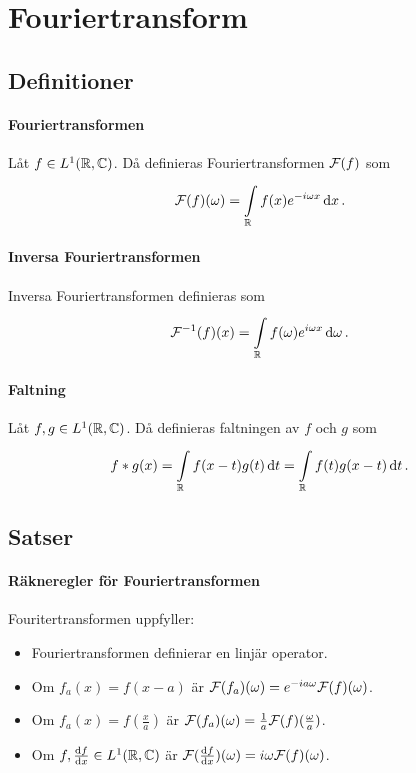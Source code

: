\section{Fouriertransform}

\subsection{Definitioner}

\paragraph{Fouriertransformen}
Låt $f\in L^{1}(\mathbb{R}, \mathbb{C})$. Då definieras Fouriertransformen $\mathcal{F}(f)$ som
\begin{align*}
	\mathcal{F}(f)(\omega) = \int\limits_{\mathbb{R}}^{}f(x)e^{-i\omega x}\dd{x}.
\end{align*}

\paragraph{Inversa Fouriertransformen}
Inversa Fouriertransformen definieras som
\begin{align*}
	\mathcal{F}^{-1}(f)(x) = \int\limits_{\mathbb{R}}^{}f(\omega)e^{i\omega x}\dd{\omega}.
\end{align*}

\paragraph{Faltning}
Låt $f, g\in L^{1}(\mathbb{R}, \mathbb{C})$. Då definieras faltningen av $f$ och $g$ som
\begin{align*}
	f * g(x) = \int\limits_{\mathbb{R}}^{}f(x - t)g(t)\dd{t} = \int\limits_{\mathbb{R}}^{}f(t)g(x - t)\dd{t}.
\end{align*}

\subsection{Satser}

\paragraph{Räkneregler för Fouriertransformen}
Fouritertransformen uppfyller:
\begin{itemize}
	\item Fouriertransformen definierar en linjär operator.
	\item Om $f_{a}(x) = f(x - a)$ är $\mathcal{F}(f_{a})(\omega) = e^{-ia\omega}\mathcal{F}(f)(\omega)$.
	\item Om $f_{a}(x) = f(\frac{x}{a})$ är $\mathcal{F}(f_{a})(\omega) = \frac{1}{a}\mathcal{F}(f)(\frac{\omega}{a})$.
	\item Om $f,\dv{f}{x}\in L^{1}(\mathbb{R}, \mathbb{C})$ är $\mathcal{F}(\dv{f}{x})(\omega) = i\omega\mathcal{F}(f)(\omega)$.
\end{itemize}

